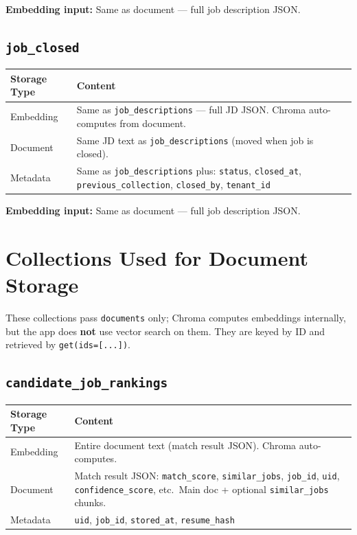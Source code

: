 \documentclass[11pt]{article}
\begin{document}
\textbf{Embedding input:} Same as document --- full job description JSON.

\subsection{\texttt{job\_closed}}

\begin{table}[h]
\centering
\begin{tabular}{@{}p{2.2cm}p{11cm}@{}}
\toprule
\textbf{Storage Type} & \textbf{Content} \\
\midrule
Embedding & Same as \texttt{job\_descriptions} --- full JD JSON. Chroma auto-computes from document. \\
\midrule
Document & Same JD text as \texttt{job\_descriptions} (moved when job is closed). \\
\midrule
Metadata & Same as \texttt{job\_descriptions} plus: \texttt{status}, \texttt{closed\_at}, \texttt{previous\_collection}, \texttt{closed\_by}, \texttt{tenant\_id} \\
\bottomrule
\end{tabular}
\end{table}

\textbf{Embedding input:} Same as document --- full job description JSON.

\section{Collections Used for Document Storage}

These collections pass \texttt{documents} only; Chroma computes embeddings internally, but the app does \textbf{not} use vector search on them. They are keyed by ID and retrieved by \texttt{get(ids=[...])}.

\subsection{\texttt{candidate\_job\_rankings}}

\begin{table}[h]
\centering
\begin{tabular}{@{}p{2.2cm}p{11cm}@{}}
\toprule
\textbf{Storage Type} & \textbf{Content} \\
\midrule
Embedding & Entire document text (match result JSON). Chroma auto-computes. \\
\midrule
Document & Match result JSON: \texttt{match\_score}, \texttt{similar\_jobs}, \texttt{job\_id}, \texttt{uid}, \texttt{confidence\_score}, etc.\ Main doc + optional \texttt{similar\_jobs} chunks. \\
\midrule
Metadata & \texttt{uid}, \texttt{job\_id}, \texttt{stored\_at}, \texttt{resume\_hash} \\
\bottomrule
\end{tabular}
\end{table}
\end{document}
